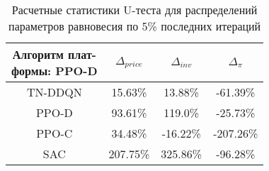 \bgroup
\def\arraystretch{1.25}
\begin{table}[H]
	\caption{Расчетные статистики U-теста для распределений параметров равновесия по 5\% последних итераций}
	\label{tables:U_dynamic}
	\begin{center}
		\vspace{-0.5em}
		\begin{tabular}{c||ccc}
			\toprule
			\makecell{Алгоритм плат-\\ формы: PPO-D} & $\Delta_{price}$ & $\Delta_{inv}$ & $\Delta_{\pi}$ \\
			\midrule
			TN-DDQN & 15.63\% & 13.88\% & -61.39\% \\
			PPO-D & 93.61\% & 119.0\% & -25.73\% \\
			PPO-C & 34.48\% & -16.22\% & -207.26\% \\
			SAC & 207.75\% & 325.86\% & -96.28\% \\
			\bottomrule
		\end{tabular}
	\end{center}
\end{table}
\egroup